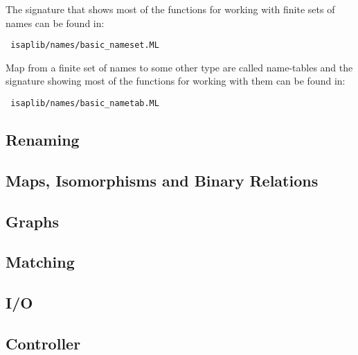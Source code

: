 \documentclass{article}
\begin{document}

The signature that shows most of the functions for working with finite
sets of names can be found in: \begin{center}{\tt
  isaplib/names/basic\_nameset.ML}\end{center}

Map from a finite set of names to some other type are called
name-tables and the signature showing most of the functions for
working with them can be found in: \begin{center}{\tt
  isaplib/names/basic\_nametab.ML}\end{center}


\subsection{Renaming}



\subsection{Maps, Isomorphisms and Binary Relations}



\subsection{Graphs}


\subsection{Matching}


\subsection{I/O}


\subsection{Controller}





\end{document}
